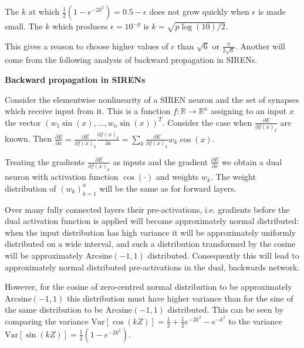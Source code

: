 \documentclass{letter}
\begin{document}
The $k$ at which $\frac{1}{2}(1-e^{-2k^2})=0.5-\epsilon$ does not grow quickly when $\epsilon$ is made small. The $k$ which produces $\epsilon=10^{-p}$ is $k=\sqrt{p\log(10)/2}$.

\begin{center}
\end{center}

This gives a reason to choose higher values of $c$ than $\sqrt{6}$ or $\frac{\pi}{2\sqrt{6}}$. Another will come from the following analysis of backward propagation in SIRENs.

{\bf Backward propagation in SIRENs}

Consider the elementwise nonlinearity of a SIREN neuron and the set of synapses which receive input from it. This is a function $f:\mathbb{R}\rightarrow \mathbb{R}^n$ assigning to an input $x$ the vector $\left(w_{1}\sin(x),...,w_{n}\sin(x)\right)^T$. Consider the case when $\frac{\partial E}{\partial f(x)_k}$ are known. Then $\frac{\partial E}{\partial x}=\frac{\partial E}{\partial f(x)_k}\frac{\partial f(x)_k}{\partial x}=\sum_k \frac{\partial E}{\partial f(x)_k}w_{k}\cos(x)$. 

Treating the gradients $\frac{\partial E}{\partial f(x)_k}$ as inputs and the gradient $\frac{\partial E}{\partial x}$ we obtain a dual neuron with activation function $\cos(\cdot)$ and weights $w_k$. The weight distribution of $\left(w_k\right)_{k=1}^n$ will be the same as for forward layers. 

Over many fully connected layers their pre-activations, i.e. gradients before the dual activation function is applied will become approximately normal distributed: when the input distribution has high variance it will be approximately uniformly distributed on a wide interval, and such a distribution transformed by the cosine will be approximately $\text{Arcsine}(-1,1)$ distributed. Consequently this will lead to approximately normal distributed pre-activations in the dual, backwards network.

However, for the cosine of zero-centred normal distribution to be approximately $\text{Arcsine}(-1,1)$ this distribution must have higher variance than for the sine of the same distribution to be $\text{Arcsine}(-1,1)$ distributed. This can be seen by comparing the variance $\text{Var}\left[\cos(kZ)\right] = \frac{1}{2} + \frac{1}{2}e^{-2k^2}-e^{-k^2}$ to the variance $\text{Var}\left[\sin(kZ)\right]=\frac{1}{2}(1-e^{-2k^2})$.
\end{document}
